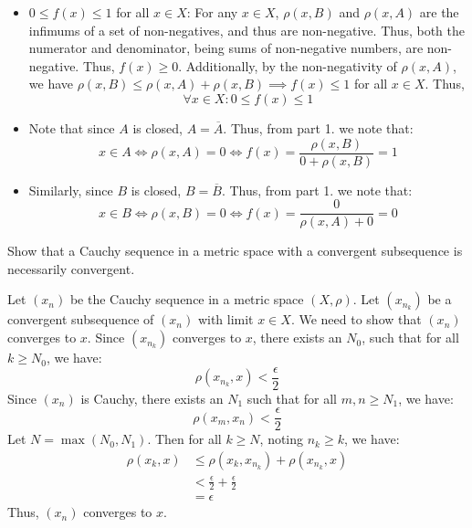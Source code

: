 \documentclass[12pt]{article}
\begin{document}
\begin{solu}
\begin{enumerate}
        \begin{itemize}
            \item $0 \leq f(x) \leq 1$ for all $x \in X$: For any $x \in X$, $\rho(x, B)$ and $\rho(x, A)$ are the infimums of a set of non-negatives, and thus are non-negative. Thus, both the numerator and denominator, being sums of non-negative numbers, are non-negative. Thus, $f(x) \geq 0$. Additionally, by the non-negativity of $\rho(x, A)$, we have $\rho(x, B) \leq \rho(x, A) + \rho(x, B) \implies f(x) \leq 1$ for all $x \in X$. Thus,
            \[ \forall x \in X: 0 \leq f(x) \leq 1 \]
            \item Note that since $A$ is closed, $A = \overline{A}$. Thus, from part 1. we note that: 
            \[ x \in A \iff \rho(x, A) = 0 \iff f(x) = \frac{\rho(x, B)}{0 + \rho(x, B)} = 1\]
            \item Similarly, since $B$ is closed, $B = \overline{B}$. Thus, from part 1. we note that:
            \[ x \in B \iff \rho(x, B) = 0 \iff f(x) = \frac{0}{\rho(x, A) + 0} = 0\]
        \end{itemize}
    \end{enumerate}
\end{solu}
\newpage


\begin{problab}{4}
    Show that a Cauchy sequence in a metric space with a convergent subsequence is necessarily convergent. 
\end{problab}

\begin{solu}
    Let $(x_n)$ be the Cauchy sequence in a metric space $(X, \rho)$. Let $(x_{n_k})$ be a convergent subsequence of $(x_n)$ with limit $x \in X$. We need to show that $(x_n)$ converges to $x$. \bbni
    Since $(x_{n_k})$ converges to $x$, there exists an $N_0$, such that for all $k \geq N_0$, we have:
    \[ \rho(x_{n_k}, x) < \frac{\epsilon}{2} \]
    Since $(x_n)$ is Cauchy, there exists an $N_1$ such that for all $m, n \geq N_1$, we have:
    \[ \rho(x_m, x_n) < \frac{\epsilon}{2} \]
    Let $N = \max(N_0, N_1)$. Then for all $k \geq N$, noting $n_k \geq k$, we have:
    \begin{align*}
        \rho(x_{k}, x) &\leq \rho(x_{k}, x_{n_k}) + \rho(x_{n_k}, x) \\
        &< \frac{\epsilon}{2} + \frac{\epsilon}{2} \\
        &= \epsilon
    \end{align*}
    Thus, $(x_n)$ converges to $x$.
\end{solu}
\newpage
\end{document}

